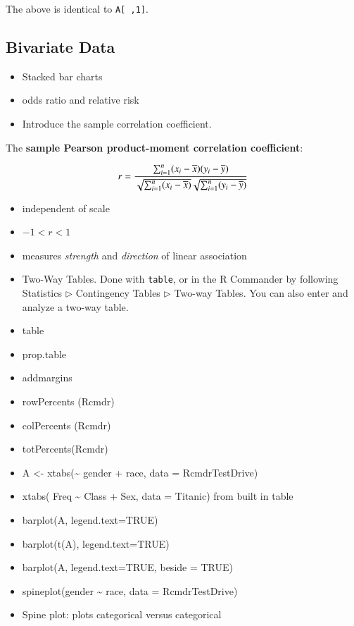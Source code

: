 \documentclass[captions=tableheading]{scrbook}
\begin{document}
The above is identical to \texttt{A[ ,1]}. 
\subsection{Bivariate Data}
\label{sec-3-5-1}

\label{sub:Bivariate-Data}

\begin{itemize}
\item Stacked bar charts
\item odds ratio and relative risk
\item Introduce the sample correlation coefficient.
\end{itemize}

The \textbf{sample Pearson product-moment correlation coefficient}:

\[
r=\frac{\sum_{i=1}^{n}(x_{i}-\overline{x})(y_{i}-\overline{y})}{\sqrt{\sum_{i=1}^{n}(x_{i}-\overline{x})}\sqrt{\sum_{i=1}^{n}(y_{i}-\overline{y})}}
\]

\begin{itemize}
\item independent of scale
\item \(-1<r<1\)
\item measures \emph{strength} and \emph{direction} of linear association
\item Two-Way Tables. Done with \texttt{table}, or in the \textsf{R} Commander by following \textsf{Statistics \(\triangleright\) Contingency Tables \(\triangleright\)} \textsf{Two-way Tables}. You can also enter and analyze a two-way table.
\end{itemize}


\begin{itemize}
\item table
\item prop.table
\item addmargins
\item rowPercents (Rcmdr)
\item colPercents (Rcmdr)
\item totPercents(Rcmdr)
\item A <- xtabs(\~{} gender + race, data = RcmdrTestDrive)
\item xtabs( Freq \~{} Class + Sex, data = Titanic) from built in table
\item barplot(A, legend.text=TRUE)
\item barplot(t(A), legend.text=TRUE)
\item barplot(A, legend.text=TRUE, beside = TRUE)
\item spineplot(gender \~{} race, data = RcmdrTestDrive)
\item Spine plot: plots categorical versus categorical
\end{itemize}
\end{document}
